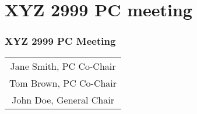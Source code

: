\documentclass[17pt]{beamer}
\date{}
\begin{document}
\section{XYZ 2999 PC meeting}

\frame
{
  \frametitle{XYZ 2999 PC Meeting}

  \vfill
  \vfill

  \begin{center}
    \footnotesize 
    \begin{tabular}{c}
      Jane Smith, PC Co-Chair \\[0.25cm]
      Tom Brown, PC Co-Chair \\[0.25cm]
      John Doe, General Chair \\[0.25cm]
    \end{tabular}
  \end{center}
}
\end{document}
